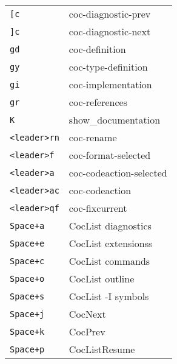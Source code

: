 \begin{multicols}{3}
	\section{}
	\begin{tabular}{@{}ll@{}}
		\verb![c!         & coc-diagnostic-prev     \\
		\verb!]c!         & coc-diagnostic-next     \\
		\verb!gd!         & coc-definition          \\
		\verb!gy!         & coc-type-definition     \\
		\verb!gi!         & coc-implementation      \\
		\verb!gr!         & coc-references          \\
		\verb!K!          & show\_documentation     \\
		\verb!<leader>rn! & coc-rename              \\
		\verb!<leader>f ! & coc-format-selected     \\
		\verb!<leader>a ! & coc-codeaction-selected \\
		\verb!<leader>ac! & coc-codeaction          \\
		\verb!<leader>qf! & coc-fixcurrent          \\
		\verb!Space+a!    & CocList diagnostics     \\
		\verb!Space+e!    & CocList extensionss     \\
		\verb!Space+c!    & CocList commands        \\
		\verb!Space+o!    & CocList outline         \\
		\verb!Space+s!    & CocList -I symbols      \\
		\verb!Space+j!    & CocNext                 \\
		\verb!Space+k!    & CocPrev                 \\
		\verb!Space+p!    & CocListResume           \\
	\end{tabular}


\end{multicols}
